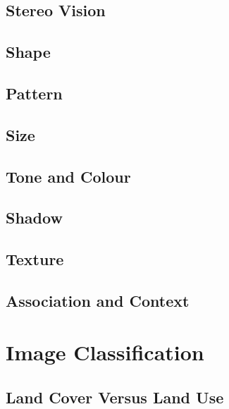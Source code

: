 \documentclass[
]{book}
\begin{document}
\hypertarget{stereo-vision}{%
\subsection{Stereo Vision}\label{stereo-vision}}

\hypertarget{shape}{%
\subsection{Shape}\label{shape}}

\hypertarget{pattern}{%
\subsection{Pattern}\label{pattern}}

\hypertarget{size}{%
\subsection{Size}\label{size}}

\hypertarget{tone-and-colour}{%
\subsection{Tone and Colour}\label{tone-and-colour}}

\hypertarget{shadow}{%
\subsection{Shadow}\label{shadow}}

\hypertarget{texture}{%
\subsection{Texture}\label{texture}}

\hypertarget{association-and-context}{%
\subsection{Association and Context}\label{association-and-context}}

\hypertarget{image-classification}{%
\section{Image Classification}\label{image-classification}}

\hypertarget{land-cover-versus-land-use}{%
\subsection{Land Cover Versus Land Use}\label{land-cover-versus-land-use}}
\end{document}
